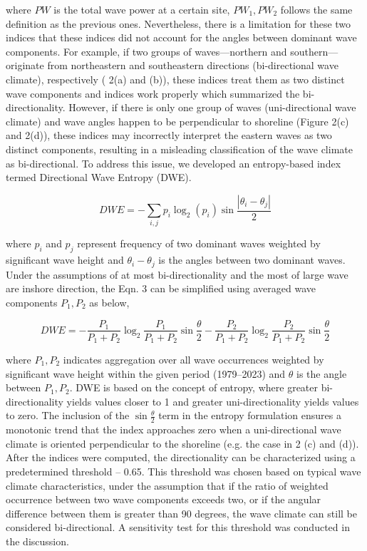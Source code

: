 where $PW$ is the total wave power at a certain site, $PW_1, PW_2$ follows the same definition as the previous ones. Nevertheless, there is a limitation for these two indices that these indices did not account for the angles between dominant wave components. For example, if two groups of waves—northern and southern—originate from northeastern and southeastern directions (bi-directional wave climate), respectively ( 2(a) and (b)), these indices treat them as two distinct wave components and indices work properly which summarized the bi-directionality. However, if there is only one group of waves (uni-directional wave climate) and wave angles happen to be perpendicular to shoreline (Figure 2(c) and 2(d)), these indices may incorrectly interpret the eastern waves as two distinct components, resulting in a misleading classification of the wave climate as bi-directional. To address this issue, we developed an entropy-based index termed Directional Wave Entropy (DWE). 

\begin{equation}
DWE = -\sum_{i,j}p_i\log_2(p_i)\sin{\frac{|\theta_i - \theta_j|}{2}}
\label{eq:eq3.3}
\end{equation}

where $p_i$ and $p_j$ represent frequency of two dominant waves weighted by significant wave height and $\theta_i-\theta_j$ is the angles between two dominant waves. Under the assumptions of at most bi-directionality and the most of large wave are inshore direction, the Eqn. 3 can be simplified using averaged wave components $P_1,P_2$ as below,

\begin{equation}
    DWE = - \frac{P_1}{P_1+P_2}\log_2\frac{P_1}{P_1+P_2}\sin{\frac{\theta}{2}}- \frac{P_2}{P_1+P_2}\log_2\frac{P_2}{P_1+P_2}\sin{\frac{\theta}{2}}
\label{eq:eq3.4}
\end{equation}

where $P_1, P_2$ indicates aggregation over all wave occurrences weighted by significant wave height within the given period (1979–2023) and $\theta$ is the angle between $P_1, P_2$. DWE is based on the concept of entropy, where greater bi-directionality yields values closer to 1 and greater uni-directionality yields values to zero. The inclusion of the $\sin{\frac{\theta}{2}}$ term in the entropy formulation ensures a monotonic trend that the index approaches zero when a uni-directional wave climate is oriented perpendicular to the shoreline (e.g. the case in  2 (c) and (d)). After the indices were computed, the directionality can be characterized using a predetermined threshold – 0.65. This threshold was chosen based on typical wave climate characteristics, under the assumption that if the ratio of weighted occurrence between two wave components exceeds two, or if the angular difference between them is greater than 90 degrees, the wave climate can still be considered bi-directional. A sensitivity test for this threshold was conducted in the discussion.

